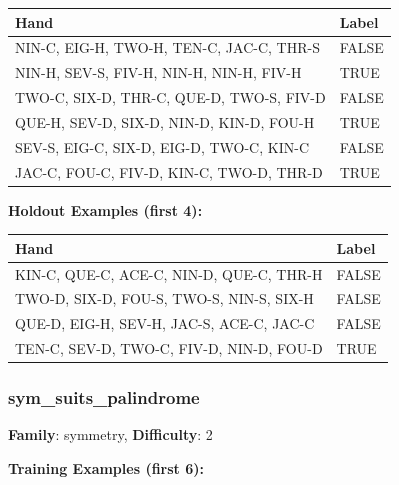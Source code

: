 \documentclass[10pt,a4paper]{article}
\begin{document}
\begin{small}
\begin{tabular}{p{8cm}l}
\toprule
Hand & Label \\
\midrule
NIN-C, EIG-H, TWO-H, TEN-C, JAC-C, THR-S & \textcolor{negative}{FALSE} \\
NIN-H, SEV-S, FIV-H, NIN-H, NIN-H, FIV-H & \textcolor{positive}{TRUE} \\
TWO-C, SIX-D, THR-C, QUE-D, TWO-S, FIV-D & \textcolor{negative}{FALSE} \\
QUE-H, SEV-D, SIX-D, NIN-D, KIN-D, FOU-H & \textcolor{positive}{TRUE} \\
SEV-S, EIG-C, SIX-D, EIG-D, TWO-C, KIN-C & \textcolor{negative}{FALSE} \\
JAC-C, FOU-C, FIV-D, KIN-C, TWO-D, THR-D & \textcolor{positive}{TRUE} \\
\bottomrule
\end{tabular}
\end{small}

\textbf{Holdout Examples (first 4):}

\begin{small}
\begin{tabular}{p{8cm}l}
\toprule
Hand & Label \\
\midrule
KIN-C, QUE-C, ACE-C, NIN-D, QUE-C, THR-H & \textcolor{negative}{FALSE} \\
TWO-D, SIX-D, FOU-S, TWO-S, NIN-S, SIX-H & \textcolor{negative}{FALSE} \\
QUE-D, EIG-H, SEV-H, JAC-S, ACE-C, JAC-C & \textcolor{negative}{FALSE} \\
TEN-C, SEV-D, TWO-C, FIV-D, NIN-D, FOU-D & \textcolor{positive}{TRUE} \\
\bottomrule
\end{tabular}
\end{small}

\vspace{0.5cm}

\subsubsection{sym\_suits\_palindrome}

\textbf{Family}: symmetry, \textbf{Difficulty}: 2

\textbf{Training Examples (first 6):}
\end{document}
